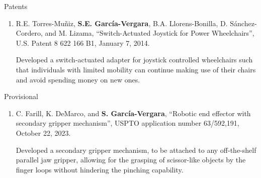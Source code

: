 \documentclass{resume} %
\newcommand{\sectionspace}{\vspace{3mm}}
\newcommand{\Sergio}{\textbf{S. Garc\'{i}a-Vergara}}
\begin{document}


\sectionspace

\begin{rSection}{Patents}

\begin{rSubsection}{}{}{}{}
\item
\begin{enumerate}
\item R.E. Torres-Mu\~{n}iz, \textbf{S.E. Garc\'{i}a-Vergara},
  B.A. Llorens-Bonilla, D. S\'{a}nchez-Cordero, and M. Lizama, ``Switch-Actuated
  Joystick for Power Wheelchairs'', U.S. Patent 8 622 166 B1, January 7, 2014.

  Developed a switch-actuated adapter for joystick controlled wheelchairs such
  that individuals with limited mobility can continue making use of their chairs
  and avoid spending money on new ones.

\end{enumerate}
\end{rSubsection}

\begin{rSubsection}{Provisional}{}{}{}
\item
\begin{enumerate}
\item C. Farill, K. DeMarco, and \Sergio, ``Robotic end effector with secondary
  gripper mechanism'', USPTO application number 63/592,191, October 22, 2023.

  Developed a secondary gripper mechanism, to be attached to any off-the-shelf
  parallel jaw gripper, allowing for the grasping of scissor-like objects by the
  finger loops without hindering the pinching capability.

\end{enumerate}
\end{rSubsection}

\end{rSection}



\end{document}
